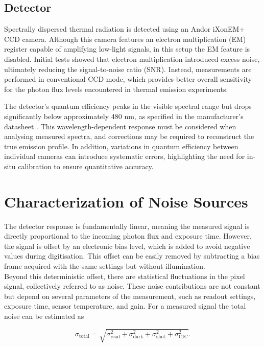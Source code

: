 \documentclass[
	parskip=half,
	a4paper,
]{scrarticle}
\begin{document}
\subsection{Detector}
Spectrally dispersed thermal radiation is detected using an Andor iXonEM+ CCD camera. Although this camera features an electron multiplication (EM) register capable of amplifying low-light signals, in this setup the EM feature is disabled. Initial tests showed that electron multiplication introduced excess noise, ultimately reducing the signal-to-noise ratio (SNR). Instead, measurements are performed in conventional CCD mode, which provides better overall sensitivity for the photon flux levels encountered in thermal emission experiments.

The detector's quantum efficiency peaks in the visible spectral range but drops significantly below approximately 480 nm, as specified in the manufacturer's datasheet \autocite{andor_ixonem_nodate}. This wavelength-dependent response must be considered when analysing measured spectra, and corrections may be required to reconstruct the true emission profile. In addition, variations in quantum efficiency between individual cameras can introduce systematic errors, highlighting the need for in-situ calibration to ensure quantitative accuracy.


\section{Characterization of Noise Sources}

The detector response is fundamentally linear, meaning the measured signal is directly proportional to the incoming photon flux and exposure time. However, the signal is offset by an electronic bias level, which is added to avoid negative values during digitisation. This offset can be easily removed by subtracting a bias frame acquired with the same settings but without illumination.\\
Beyond this deterministic offset, there are statistical fluctuations in the pixel signal, collectively referred to as noise. These noise contributions are not constant but depend on several parameters of the measurement, such as readout settings, exposure time, sensor temperature, and gain. For a measured signal the total noise can be estimated as

\begin{equation}
    \sigma_{\text{total}} = \sqrt{\sigma_{\text{read}}^2 + \sigma_{\text{dark}}^2 + \sigma_{\text{shot}}^2 + \sigma_{\text{CIC}}^2}.
\end{equation}
\end{document}
